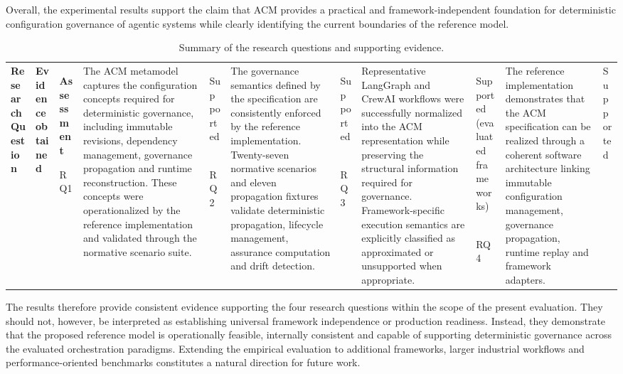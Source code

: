 \documentclass[10pt]{article}
\begin{document}
Overall, the experimental results support the claim that ACM provides a practical and framework-independent foundation for deterministic configuration governance of agentic systems while clearly identifying the current boundaries of the reference model.

\begin{table}[t]
\centering
\caption{Summary of the research questions and supporting evidence.}
\label{tab}
\begin{tabularx}{\textwidth}{lXl}
\toprule
\textbf{Research Question} &
\textbf{Evidence obtained} &
\textbf{Assessment} \
\midrule

RQ1 &
The ACM metamodel captures the configuration concepts required for deterministic governance, including immutable revisions, dependency management, governance propagation and runtime reconstruction. These concepts were operationalized by the reference implementation and validated through the normative scenario suite. &
Supported \

RQ2 &
The governance semantics defined by the specification are consistently enforced by the reference implementation. Twenty-seven normative scenarios and eleven propagation fixtures validate deterministic propagation, lifecycle management, assurance computation and drift detection. &
Supported \

RQ3 &
Representative LangGraph and CrewAI workflows were successfully normalized into the ACM representation while preserving the structural information required for governance. Framework-specific execution semantics are explicitly classified as approximated or unsupported when appropriate. &
Supported (evaluated frameworks) \

RQ4 &
The reference implementation demonstrates that the ACM specification can be realized through a coherent software architecture linking immutable configuration management, governance propagation, runtime replay and framework adapters. &
Supported \

\bottomrule
\end{tabularx}
\end{table}

The results therefore provide consistent evidence supporting the four research questions within the scope of the present evaluation. They should not, however, be interpreted as establishing universal framework independence or production readiness. Instead, they demonstrate that the proposed reference model is operationally feasible, internally consistent and capable of supporting deterministic governance across the evaluated orchestration paradigms. Extending the empirical evaluation to additional frameworks, larger industrial workflows and performance-oriented benchmarks constitutes a natural direction for future work.
\end{document}
